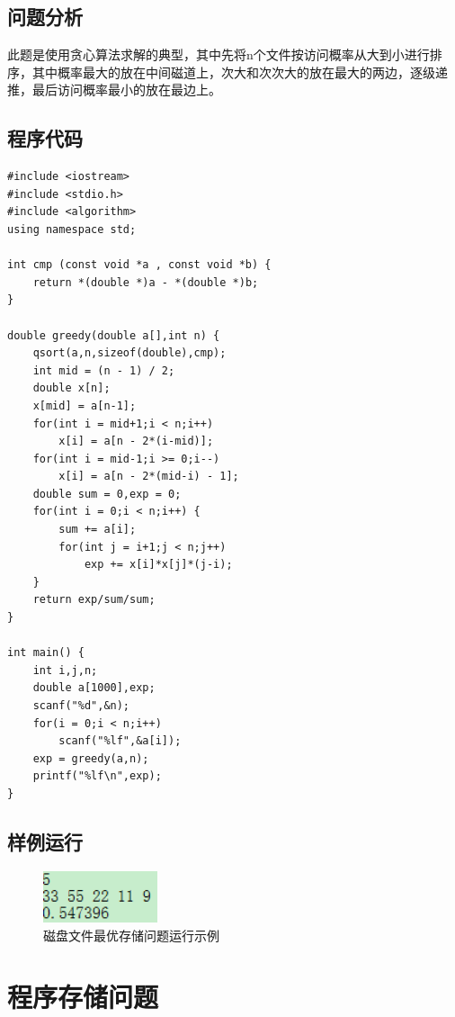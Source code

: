 \documentclass[UTF8]{ctexart}
\begin{document}
    \subsection{问题分析}
    此题是使用贪心算法求解的典型，其中先将n个文件按访问概率从大到小进行排序，其中概率最大的放在中间磁道上，次大和次次大的放在最大的两边，逐级递推，最后访问概率最小的放在最边上。
    \subsection{程序代码}
    \begin{small}
    \begin{lstlisting}
#include <iostream>
#include <stdio.h>   
#include <algorithm>
using namespace std;   
  
int cmp (const void *a , const void *b) {    
    return *(double *)a - *(double *)b;    
}   
  
double greedy(double a[],int n) {   
    qsort(a,n,sizeof(double),cmp);   
    int mid = (n - 1) / 2;   
    double x[n];   
    x[mid] = a[n-1];   
    for(int i = mid+1;i < n;i++)   
        x[i] = a[n - 2*(i-mid)];   
    for(int i = mid-1;i >= 0;i--)   
        x[i] = a[n - 2*(mid-i) - 1];   
    double sum = 0,exp = 0;   
    for(int i = 0;i < n;i++) {   
        sum += a[i];   
        for(int j = i+1;j < n;j++)   
            exp += x[i]*x[j]*(j-i);   
    }   
    return exp/sum/sum;   
}   
           
int main() {   
    int i,j,n;   
    double a[1000],exp;   
    scanf("%d",&n);   
    for(i = 0;i < n;i++)   
        scanf("%lf",&a[i]);   
    exp = greedy(a,n);   
    printf("%lf\n",exp);    
} 
    \end{lstlisting}
    \end{small}
    \subsection{样例运行}
    \begin{figure}[!htb]
      \centering
      \includegraphics[width=0.3\textwidth]{../img/4.2.PNG}
      \caption{磁盘文件最优存储问题运行示例}\label{磁盘文件最优存储问题运行示例}
    \end{figure}
    
    \section{程序存储问题}
\end{document}
